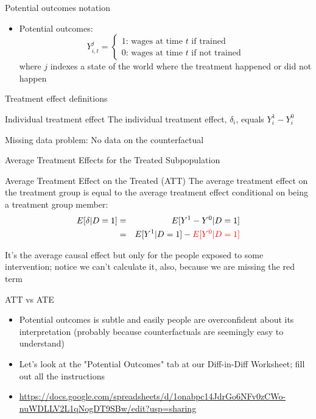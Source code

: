 \documentclass{beamer}
\begin{document}
\begin{frame}{Potential outcomes notation}

	\begin{itemize}

	\item Potential outcomes: $$Y_{i,t}^j =\begin{cases} 1 \text{: wages at time $t$ if trained} \\ 0 \text{: wages at time $t$ if not trained} \end{cases}$$where $j$ indexes a state of the world where the treatment happened or did not happen

	\end{itemize}
\end{frame}



\begin{frame}{Treatment effect definitions}


	\begin{block}{Individual treatment effect}
	    The individual treatment effect,  $\delta_i$, equals $Y_i^1-Y_i^0$
	\end{block}

Missing data problem:  No data on the counterfactual

\end{frame}


\begin{frame}{Average Treatment Effects for the Treated Subpopulation}
	\begin{block}{Average Treatment Effect on the Treated (ATT)}
	The average treatment effect on the treatment group is equal to the average treatment effect conditional on being a treatment group member:
		\begin{eqnarray*}
		E[\delta|D=1]&=&E[Y^1-Y^0|D=1] \nonumber \\
		&=&E[Y^1|D=1]-\textcolor{red}{E[Y^0|D=1]}
		\end{eqnarray*}
	\end{block}

	\bigskip

It's the average causal effect but only for the people exposed to some intervention; notice we can't calculate it, also, because we are missing the red term


\end{frame}

\begin{frame}{ATT vs ATE}

\begin{itemize}
\item Potential outcomes is subtle and easily people are overconfident about its interpretation (probably because counterfactuals are seemingly easy to understand)
\item Let's look at the "Potential Outcomes" tab at our Diff-in-Diff Worksheet; fill out all the instructions 
\item \url{https://docs.google.com/spreadsheets/d/1onabpc14JdrGo6NFv0zCWo-nuWDLLV2L1qNogDT9SBw/edit?usp=sharing}
\end{itemize}

\end{frame}
\end{document}
